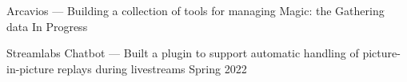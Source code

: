 Arcavios --- Building a collection of tools for managing Magic: the Gathering data  \hfill In Progress

Streamlabs Chatbot --- Built a plugin to support automatic handling of picture-in-picture replays during livestreams    \hfill Spring 2022
